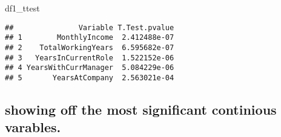 \documentclass[
]{article}
\newenvironment{Shaded}{\begin{snugshade}}{\end{snugshade}}
\newcommand{\NormalTok}[1]{#1}
\begin{document}
\begin{Shaded}
\begin{Highlighting}[]
\NormalTok{df1\_ttest}
\end{Highlighting}
\end{Shaded}

\begin{verbatim}
##               Variable T.Test.pvalue
## 1        MonthlyIncome  2.412488e-07
## 2    TotalWorkingYears  6.595682e-07
## 3   YearsInCurrentRole  1.522152e-06
## 4 YearsWithCurrManager  5.084229e-06
## 5       YearsAtCompany  2.563021e-04
\end{verbatim}

\hypertarget{showing-off-the-most-significant-continious-varables.}{%
\subsection{showing off the most significant continious
varables.}\label{showing-off-the-most-significant-continious-varables.}}
\end{document}
